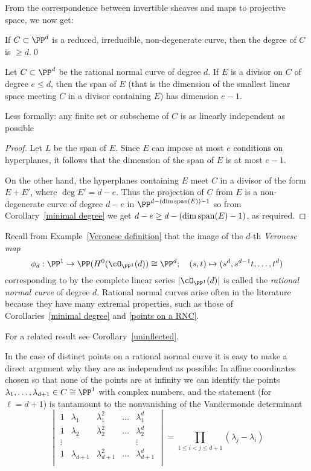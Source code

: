 From the correspondence between invertible sheaves and maps to projective space, we now get:
\begin{corollary}\label{minimal degree}
If $C\subset \PP^d$ is a reduced, irreducible, non-degenerate curve, then the degree of $C$ is $\geq d$.\qed
\end{corollary}

\begin{corollary}\label{independence of points on a RNC}
Let $C\subset \PP^d$ be the rational normal curve of degree $d$. If $E$ is a divisor on $C$ of degree $e\leq d$, then the
span of $E$ (that is the dimension of the smallest linear space meeting $C$ in a divisor containing $E$) has dimension $e-1$.
\end{corollary}
Less formally: any finite set or subscheme of $C$ is as linearly independent as possible

\begin{proof}
Let $L$ be the span of $E$. Since $E$ can impose at most $e$ conditions on hyperplanes, it follows that the dimension of the span of $E$ is
at most $e-1$.

On the other hand, the hyperplanes containing $E$ meet $C$ in a divisor of the form $E+E'$, where
$\deg E' = d-e$. Thus the projection of $C$ from $E$ is a non-degenerate curve of degree $d-e$ in $\PP^{d-(\dim {\rm span}(E))-1}$
so from Corollary~\ref{minimal degree} we get $d-e \geq d-(\dim {\rm span}(E)-1)$, as required.
\end{proof}

Recall from Example~\ref{Veronese definition} that the image of the $d$-th \emph{Veronese map}  
$$
\phi_d: \PP^1 \to \PP(H^0(\cO_{\PP^1}(d)) \cong \PP^d; \quad (s,t) \mapsto (s^d, s^{d-1}t, \dots, t^d)
$$
corresponding to by the complete linear series $|\cO_{\PP^1}(d)|$ is called the \emph{rational normal curve} of degree $d$. Rational normal curves arise often in the literature because they have many extremal properties, such as those of Corollaries~\ref{minimal degree} and \ref{points on a RNC}.

For a related result see Corollary~\ref{uninflected}.

In the case of distinct points on a rational normal curve
it is easy to make a direct argument why they are as independent as possible: In affine coordinates chosen so that none of the points are
at infinity we can identify the points $\lambda_1,\dots,\lambda_{d+1} \in C \cong \PP^1$ with complex numbers, and the statement (for $\ell = d+1$) is tantamount to the nonvanishing of the Vandermonde determinant
$$
\begin{vmatrix}
1 & \lambda_1 & \lambda_1^2 & \dots & \lambda_1^d \\
1 & \lambda_2 & \lambda_2^2 & \dots & \lambda_2^d \\
\vdots & & & & \vdots \\
1 & \lambda_{d+1} & \lambda_{d+1}^2 & \dots & \lambda_{d+1}^d \\
\end{vmatrix}
= \prod_{1 \leq i < j \leq d+1} (\lambda_j - \lambda_i)
$$


